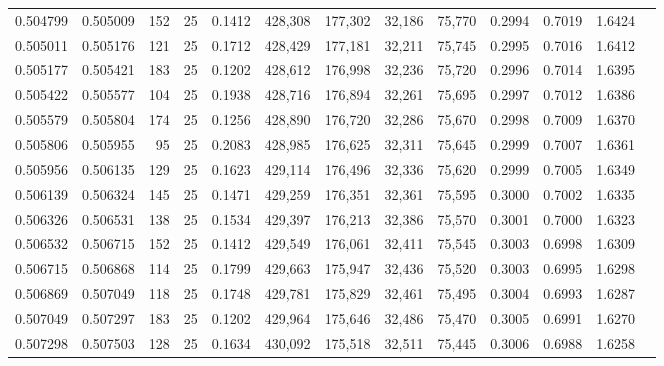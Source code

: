 \begin{tabular}{rrrrrrrrrrrrr}
0.504799 & 0.505009 &   152 &  25 &                                     0.1412 & 428,308 & 177,302 &  32,186 &  75,770 & 0.2994 & 0.7019 & 1.6424 \\
0.505011 & 0.505176 &   121 &  25 &                                     0.1712 & 428,429 & 177,181 &  32,211 &  75,745 & 0.2995 & 0.7016 & 1.6412 \\
0.505177 & 0.505421 &   183 &  25 &                                     0.1202 & 428,612 & 176,998 &  32,236 &  75,720 & 0.2996 & 0.7014 & 1.6395 \\
0.505422 & 0.505577 &   104 &  25 &                                     0.1938 & 428,716 & 176,894 &  32,261 &  75,695 & 0.2997 & 0.7012 & 1.6386 \\
0.505579 & 0.505804 &   174 &  25 &                                     0.1256 & 428,890 & 176,720 &  32,286 &  75,670 & 0.2998 & 0.7009 & 1.6370 \\
0.505806 & 0.505955 &    95 &  25 &                                     0.2083 & 428,985 & 176,625 &  32,311 &  75,645 & 0.2999 & 0.7007 & 1.6361 \\
0.505956 & 0.506135 &   129 &  25 &                                     0.1623 & 429,114 & 176,496 &  32,336 &  75,620 & 0.2999 & 0.7005 & 1.6349 \\
0.506139 & 0.506324 &   145 &  25 &                                     0.1471 & 429,259 & 176,351 &  32,361 &  75,595 & 0.3000 & 0.7002 & 1.6335 \\
0.506326 & 0.506531 &   138 &  25 &                                     0.1534 & 429,397 & 176,213 &  32,386 &  75,570 & 0.3001 & 0.7000 & 1.6323 \\
0.506532 & 0.506715 &   152 &  25 &                                     0.1412 & 429,549 & 176,061 &  32,411 &  75,545 & 0.3003 & 0.6998 & 1.6309 \\
0.506715 & 0.506868 &   114 &  25 &                                     0.1799 & 429,663 & 175,947 &  32,436 &  75,520 & 0.3003 & 0.6995 & 1.6298 \\
0.506869 & 0.507049 &   118 &  25 &                                     0.1748 & 429,781 & 175,829 &  32,461 &  75,495 & 0.3004 & 0.6993 & 1.6287 \\
0.507049 & 0.507297 &   183 &  25 &                                     0.1202 & 429,964 & 175,646 &  32,486 &  75,470 & 0.3005 & 0.6991 & 1.6270 \\
0.507298 & 0.507503 &   128 &  25 &                                     0.1634 & 430,092 & 175,518 &  32,511 &  75,445 & 0.3006 & 0.6988 & 1.6258 \\

\end{tabular}

